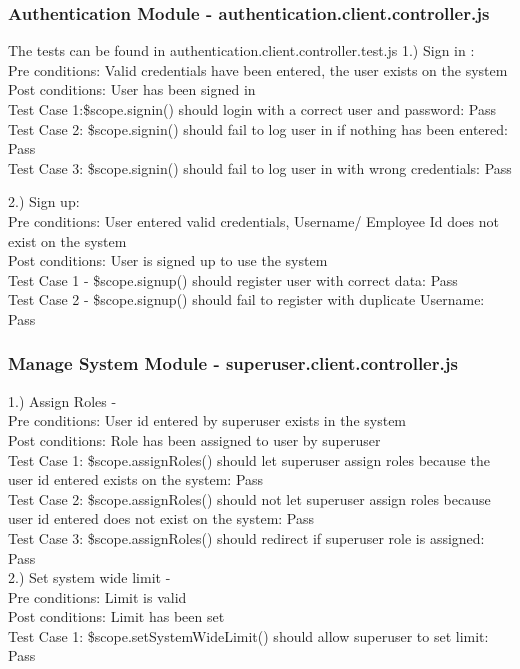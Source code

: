 \documentclass[a4paper,12pt]{report}
\begin{document}
\subsubsection{Authentication Module - authentication.client.controller.js }
The tests can be found in authentication.client.controller.test.js
1.) Sign in : \\
Pre conditions: Valid credentials have been entered, the user exists on the system
\\ Post conditions: User has been signed in
\\  Test Case 1:\$scope.signin() should login with a correct user and password: Pass
\\ Test Case 2: \$scope.signin() should fail to log user in if nothing has been entered: Pass
\\ Test Case 3: \$scope.signin()  should fail to log user in with wrong credentials: Pass

2.) Sign up: \\
Pre conditions: User entered valid credentials, Username/ Employee Id does not exist on the system
\\ Post conditions: User is signed up to use the system \\
Test Case 1 - \$scope.signup()  should register user with correct data: Pass \\
Test Case 2 - \$scope.signup()  should fail to register with duplicate Username: Pass

\subsubsection{Manage System Module - superuser.client.controller.js }
1.) Assign Roles - \\
Pre conditions: User id entered by superuser exists in the system \\
Post conditions: Role has been assigned to user by superuser \\
Test Case 1: \$scope.assignRoles() should let superuser assign roles because the user id entered exists on the system: Pass
\\ Test Case 2:  \$scope.assignRoles() should not let superuser assign roles because user id entered does not exist on the system: Pass \\
Test Case 3: \$scope.assignRoles() should redirect if superuser role is assigned: Pass \\
 
2.) Set system wide limit - \\
Pre conditions: Limit is valid \\
Post conditions: Limit has been set \\
Test Case 1: \$scope.setSystemWideLimit() should allow superuser to set limit: Pass
\end{document}
